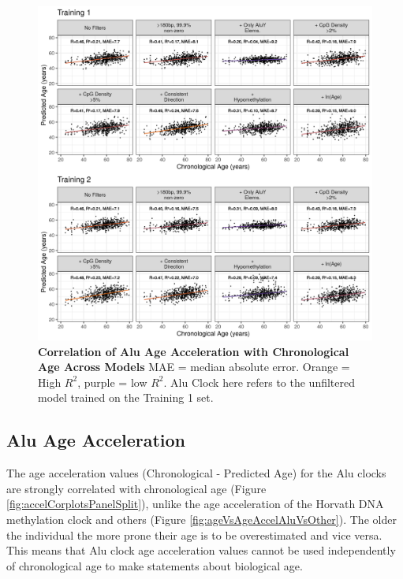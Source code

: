 \documentclass[
]{book}
\begin{document}
\begin{figure}

{\centering \includegraphics[width=0.9\linewidth]{./figs/alu_clock_age_vs_pred_age_single} 

}

\caption{\textbf{Correlation of Alu Age Acceleration with Chronological Age Across Models} MAE = median absolute error. Orange = High \(R^2\), purple = low \(R^2\). Alu Clock here refers to the unfiltered model trained on the Training 1 set.}\label{fig:aluclockageVsPredageSingle}
\end{figure}



\hypertarget{alu-age-acceleration}{%
\subsection{Alu Age Acceleration}\label{alu-age-acceleration}}

The age acceleration values (Chronological - Predicted Age) for the Alu clocks are strongly correlated with chronological age (Figure \ref{fig:accelCorplotsPanelSplit}), unlike the age acceleration of the Horvath DNA methylation clock and others (Figure \ref{fig:ageVsAgeAccelAluVsOther}).
The older the individual the more prone their age is to be overestimated and vice versa.
This means that Alu clock age acceleration values cannot be used independently of chronological age to make statements about biological age.
\end{document}
